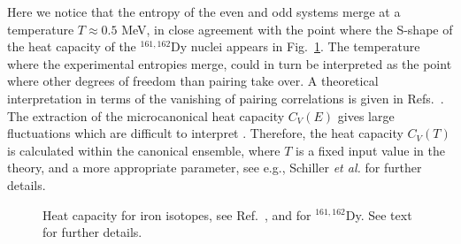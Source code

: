 \documentclass{elsart}
\begin{document}
Here we notice that the entropy of the even and odd systems merge
at a temperature $T\approx 0.5$ MeV, in close agreement with the point where
the S-shape of the heat capacity of 
the $^{161,162}$Dy nuclei appears  
in Fig.~\ref{fig:heatcapacity}. The temperature where 
the experimental entropies merge,
could in turn be interpreted as the point where other degrees of freedom
than pairing take over. A theoretical interpretation
in terms of the vanishing of pairing correlations is given 
in Refs.\ \cite{andreas2000}. 
The extraction of the microcanonical heat capacity $C_V(E)$ gives large 
fluctuations which are difficult to interpret \cite{andreas2000}. Therefore, the heat 
capacity $C_V(T)$ is calculated within the canonical ensemble, where $T$ is a 
fixed input value in the theory, and a more appropriate parameter,
see e.g., Schiller {\em et al.} \cite{andreas2000} for further details.

\begin{figure}
\begin{center}
          {\epsfxsize=20pc }
          \caption{Heat capacity for iron isotopes, see Ref.\ \cite{Al99}, 
and for $^{161,162}$Dy. See text for further details. \label{fig:heatcapacity}}
\end{center}
\end{figure}
\end{document}
